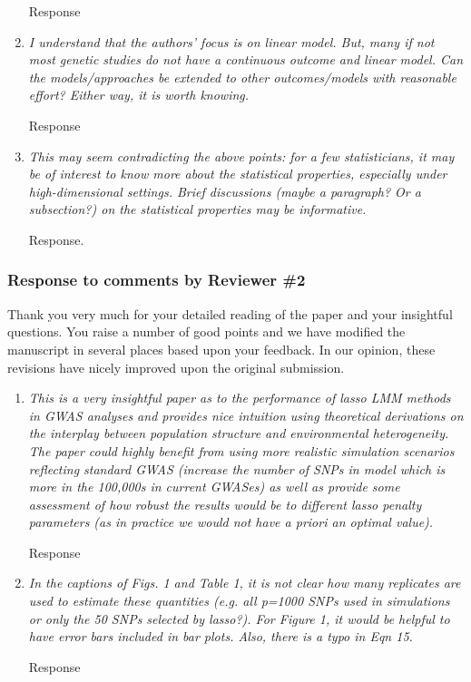 \documentclass{article}
\begin{document}
\begin{enumerate}
  Response

\item \emph{I understand that the authors’ focus is on linear model. But, many if not most genetic studies do not have a continuous outcome and linear model. Can the models/approaches be extended to other outcomes/models with reasonable effort? Either way, it is worth knowing.}

  Response

\item \emph{This may seem contradicting the above points: for a few statisticians, it may be of interest to know more about the statistical properties, especially under high-dimensional settings. Brief discussions (maybe a paragraph? Or a subsection?) on the statistical properties may be informative.}

  Response.

\end{enumerate}

\newpage

\subsubsection*{Response to comments by Reviewer \#2}

Thank you very much for your detailed reading of the paper and your insightful questions. You raise a number of good points and we have modified the manuscript in several places based upon your feedback.  In our opinion, these revisions have nicely improved upon the original submission.

\begin{enumerate}

\item \emph{This is a very insightful paper as to the performance of lasso LMM methods in GWAS analyses and provides nice intuition using theoretical derivations on the interplay between  population structure and environmental heterogeneity. The paper could highly benefit from using more realistic simulation scenarios reflecting standard GWAS (increase the number of SNPs in model which is more in the 100,000s in current GWASes) as well as provide some assessment of how robust the results would be to different lasso penalty parameters (as in practice we would not have a priori an optimal value).}

  Response

\item \emph{In the captions of Figs. 1 and Table 1, it is not clear how many replicates are used to estimate these quantities (e.g. all p=1000 SNPs used in simulations or only the 50 SNPs selected by lasso?). For Figure 1, it would be helpful to have error bars included in bar plots. Also, there is a typo in Eqn 15.}

  Response

\end{enumerate}

%
%
\end{document}
